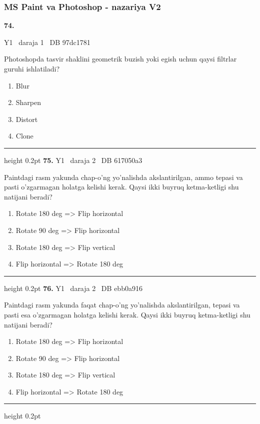 \documentclass[10pt,a4paper,oneside]{article}
\begin{document}
\subsubsection{MS Paint va Photoshop - nazariya V2}
\hypertarget{q74}{\textbf{\color{ink}74.}}  {\color{muted}\scriptsize Y1 \textbullet\ daraja 1 \textbullet\ DB 97dc1781}
\par
Photoshopda tasvir shaklini geometrik buzish yoki egish uchun qaysi filtrlar guruhi ishlatiladi?
\begin{enumerate}[label=\Alph*),leftmargin=9mm]
\item Blur
\item Sharpen
\item Distort
\item Clone
\end{enumerate}
\vspace{2mm}\hrule height 0.2pt \vspace{4mm}
\hypertarget{q75}{\textbf{\color{ink}75.}}  {\color{muted}\scriptsize Y1 \textbullet\ daraja 2 \textbullet\ DB 617050a3}
\par
Paintdagi rasm yakunda chap-o'ng yo'nalishda akslantirilgan, ammo tepasi va pasti o'zgarmagan holatga kelishi kerak. Qaysi ikki buyruq ketma-ketligi shu natijani beradi?
\begin{enumerate}[label=\Alph*),leftmargin=9mm]
\item Rotate 180 deg  =\textgreater{} Flip horizontal
\item Rotate 90 deg  =\textgreater{} Flip horizontal
\item Rotate 180 deg  =\textgreater{} Flip vertical
\item Flip horizontal =\textgreater{} Rotate 180 deg 
\end{enumerate}
\vspace{2mm}\hrule height 0.2pt \vspace{4mm}
\hypertarget{q76}{\textbf{\color{ink}76.}}  {\color{muted}\scriptsize Y1 \textbullet\ daraja 2 \textbullet\ DB ebb0a916}
\par
Paintdagi rasm yakunda faqat chap-o'ng yo'nalishda akslantirilgan, tepasi va pasti esa o'zgarmagan holatga kelishi kerak. Qaysi ikki buyruq ketma-ketligi shu natijani beradi?
\begin{enumerate}[label=\Alph*),leftmargin=9mm]
\item Rotate 180 deg  =\textgreater{} Flip horizontal
\item Rotate 90 deg  =\textgreater{} Flip horizontal
\item Rotate 180 deg  =\textgreater{} Flip vertical
\item Flip horizontal =\textgreater{} Rotate 180 deg 
\end{enumerate}
\vspace{2mm}\hrule height 0.2pt \vspace{4mm}
\end{document}
